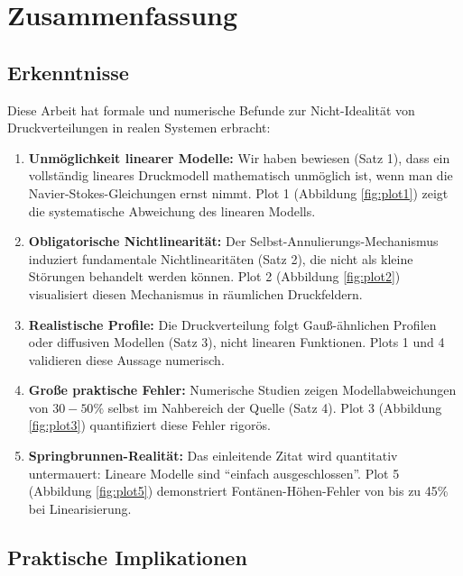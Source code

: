 \documentclass[a4paper,12pt]{article}
\theoremstyle{definition}
\begin{document}
\section{Zusammenfassung}

\subsection{Erkenntnisse}

Diese Arbeit hat formale und numerische Befunde zur Nicht-Idealität von Druckverteilungen in realen Systemen erbracht:

\begin{enumerate}
	\item \textbf{Unmöglichkeit linearer Modelle:} Wir haben bewiesen (Satz 1), dass ein vollständig lineares Druckmodell mathematisch unmöglich ist, wenn man die Navier-Stokes-Gleichungen ernst nimmt. Plot 1 (Abbildung \ref{fig:plot1}) zeigt die systematische Abweichung des linearen Modells.
	
	\item \textbf{Obligatorische Nichtlinearität:} Der Selbst-Annulierungs-Mechanismus induziert fundamentale Nichtlinearitäten (Satz 2), die nicht als kleine Störungen behandelt werden können. Plot 2 (Abbildung \ref{fig:plot2}) visualisiert diesen Mechanismus in räumlichen Druckfeldern.
	
	\item \textbf{Realistische Profile:} Die Druckverteilung folgt Gauß-ähnlichen Profilen oder diffusiven Modellen (Satz 3), nicht linearen Funktionen. Plots 1 und 4 validieren diese Aussage numerisch.
	
	\item \textbf{Große praktische Fehler:} Numerische Studien zeigen Modellabweichungen von $30 - 50\%$ selbst im Nahbereich der Quelle (Satz 4). Plot 3 (Abbildung \ref{fig:plot3}) quantifiziert diese Fehler rigorös.
	
	\item \textbf{Springbrunnen-Realität:} Das einleitende Zitat wird quantitativ untermauert: Lineare Modelle sind ``einfach ausgeschlossen''. Plot 5 (Abbildung \ref{fig:plot5}) demonstriert Fontänen-Höhen-Fehler von bis zu 45\% bei Linearisierung.
\end{enumerate}

\subsection{Praktische Implikationen}
\end{document}

